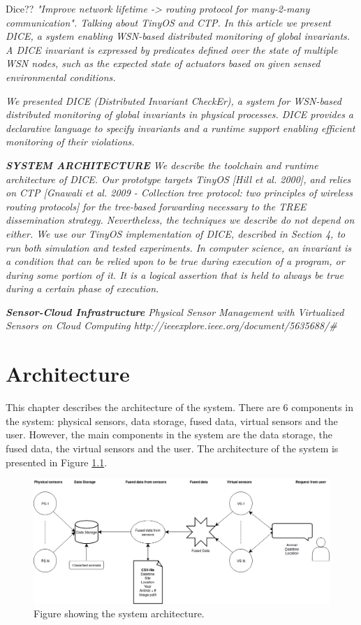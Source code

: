 \documentclass[USenglish]{uit-thesis}
\begin{document}
Dice??
\textit{"Improve network lifetime -> routing protocol for many-2-many communication". Talking about TinyOS and CTP.
In this article we present DICE, a
system enabling WSN-based distributed monitoring of global invariants. A DICE invariant is expressed by predicates defined over the state of multiple WSN nodes, such as the expected state of actuators based on given sensed environmental conditions.}

\textit{We presented DICE (Distributed Invariant CheckEr), a system for WSN-based distributed monitoring of global invariants in physical processes. DICE provides a declarative language to specify invariants and a runtime support enabling efficient monitoring of their violations.}

\textit{\textbf{SYSTEM ARCHITECTURE}
We describe the toolchain and runtime architecture of DICE. Our prototype targets TinyOS [Hill et al. 2000], and relies on CTP [Gnawali et al. 2009 - Collection tree protocol: two principles of wireless routing protocols] for the tree-based forwarding necessary to the TREE dissemination strategy. Nevertheless, the techniques we describe do not depend on either.
We use our TinyOS implementation of DICE, described in Section 4, to run both simulation and tested experiments.
In computer science, an invariant is a condition that can be relied upon to be true during execution of a program, or during some portion of it. It is a logical assertion that is held to always be true during a certain phase of execution.}


\textit{\textbf{Sensor-Cloud Infrastructure}
Physical Sensor Management with Virtualized Sensors on Cloud Computing
http://ieeexplore.ieee.org/document/5635688/#}

 
\chapter{Architecture}
This chapter describes the architecture of the system.
There are 6 components in the system: physical sensors, data storage, fused data, virtual sensors and the user. However, the main components in the system are the data storage, the fused data, the virtual sensors and the user.
The architecture of the system is presented in Figure \ref{fig:architecture}.

\begin{figure}
\centering
\includegraphics[width=\textwidth]{Architecture3.png}
\caption{Figure showing the system architecture.}
\label{fig:architecture}
\end{figure}
\end{document}
